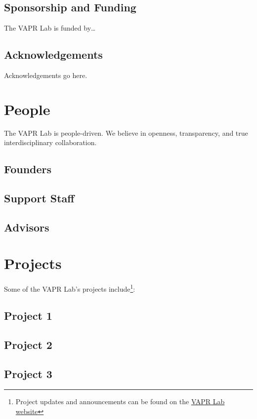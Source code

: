 \documentclass[12pt,]{memoir}
\let\rmarkdownfootnote\footnote%
\def\footnote{\protect\rmarkdownfootnote}
\begin{document}
\hypertarget{sponsorship-and-funding}{%
\section*{Sponsorship and Funding}\label{sponsorship-and-funding}}

The VAPR Lab is funded by\ldots{}

\hypertarget{acknowledgements}{%
\section*{Acknowledgements}\label{acknowledgements}}

Acknowledgements go here.

\hypertarget{people}{%
\chapter{People}\label{people}}

The VAPR Lab is people-driven. We believe in openness, transparency, and true interdisciplinary collaboration.

\hypertarget{founders}{%
\section{Founders}\label{founders}}

\hypertarget{support-staff}{%
\section{Support Staff}\label{support-staff}}

\hypertarget{advisors}{%
\section{Advisors}\label{advisors}}

\hypertarget{projects}{%
\chapter{Projects}\label{projects}}

Some of the VAPR Lab's projects include\footnote{Project updates and announcements can be found on the \href{https://VAPR-Lab.github.io/website/}{VAPR Lab website}}:

\hypertarget{project-1}{%
\section{Project 1}\label{project-1}}

\hypertarget{project-2}{%
\section{Project 2}\label{project-2}}

\hypertarget{project-3}{%
\section{Project 3}\label{project-3}}


\end{document}
